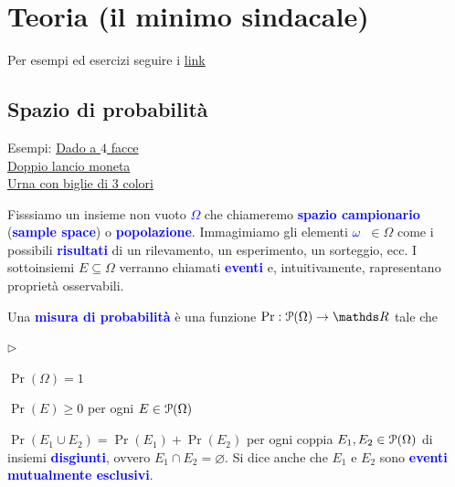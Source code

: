 \documentclass[12pt,openany]{book}
\def\RR{\mathds R}
\def\P{\EuScript P}
\def\0{\varnothing}
\newcommand{\mylabel}[1]{{\footnotesize\textsf{#1}}\hfill}
\renewenvironment{itemize}
  {\begin{list}{$\triangleright$}{%
   \setlength{\parskip}{0mm}
   \setlength{\topsep}{.2\baselineskip}
   \setlength{\rightmargin}{0mm}
   \setlength{\listparindent}{0mm}
   \setlength{\itemindent}{0mm}
   \setlength{\labelwidth}{3ex}
   \setlength{\itemsep}{.4\baselineskip}
   \setlength{\parsep}{0mm}
   \setlength{\partopsep}{0mm}
   \setlength{\labelsep}{1ex}
   \setlength{\leftmargin}{\labelwidth+\labelsep}
   \let\makelabel\mylabel}}{%
   \end{list}\vspace*{-1.3mm}}
\def\emph#1{\textcolor{blue}{\textbf{\boldmath #1}}}
\theoremstyle{mio}
\theoremstyle{liscio}
\begin{document}
\setlength{\abovedisplayskip}{-1ex}
\setlength{\belowdisplayskip}{0pt}

\renewcommand{\contentsname}{Un bignami di probabilità e statistica
\vskip0pt
\normalsize È solo una bozza. L'anno prossimo andrà meglio. Per l'ultima versione:
\vskip-20pt
{\scriptsize\url{https://github.com/domenicozambella/statistica/raw/master/dispense/dispense.pdf}}}

\tableofcontents

\chapter{Teoria (il minimo sindacale)}
\raggedbottom

Per esempi ed esercizi seguire i \hyperref[ch2]{link \faShare}

\hfill{}\clearpage\section{Spazio di probabilità}

{\color{brown}Esempi: \hyperref[tetraedro]{Dado a $4$ facce \faShare}
\\
\hphantom{Esempi:} \hyperref[doppo_lancio_moneta]{Doppio lancio moneta \faShare}
\\
\hphantom{Esempi:} \hyperref[urna_3_colori]{Urna con biglie di 3 colori \faShare}}





\def\medrel#1{\parbox[t]{5ex}{$\displaystyle\hfil #1$}}
\def\ceq#1#2#3{\parbox{24ex}{$\displaystyle #1$}\medrel{#2}$\displaystyle  #3$}


Fisssiamo un insieme non vuoto \emph{$\Omega$\/} che chiameremo \emph{spazio campionario\/}  (\emph{sample space\/}) o \emph{popolazione}. Immagimiamo gli elementi \emph{$\omega$\ }$\in\Omega$ come i possibili \emph{risultati\/} di un rilevamento, un esperimento, un sorteggio, ecc. I sottoinsiemi $E\subseteq\Omega$ verranno chiamati \emph{eventi\/} e, intuitivamente, rapresentano proprietà osservabili.

Una \emph{misura di probabilità\/} è una funzione $\Pr:\P(\Omega)\to\RR$ tale che 

\begin{itemize}
\item $\Pr(\Omega)=1$
\item $\Pr(E)\ge0$ per ogni $E\in\P(\Omega)$
\item $\Pr(E_1\cup E_2)=\Pr(E_1)+\Pr(E_2)$ per ogni coppia $E_1,E_2\in\P(\Omega)$ di insiemi \emph{disgiunti}, ovvero $E_1\cap E_2=\0$. Si dice anche che $E_1$ e $E_2$ sono \emph{eventi mutualmente esclusivi}.
\end{itemize}
\end{document}
